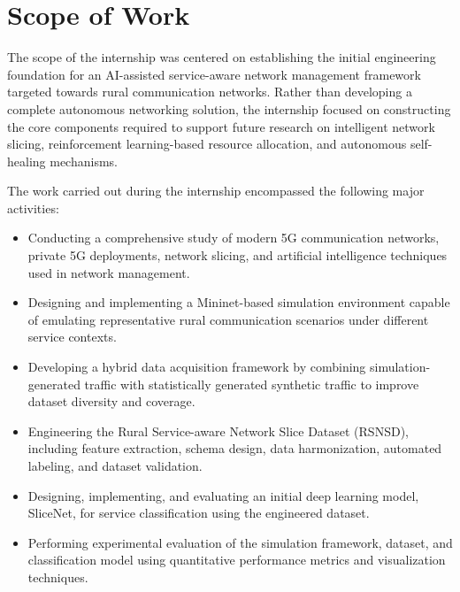 \documentclass[12pt,a4paper]{report}
\begin{document}
	
	\section{Scope of Work}
	\label{sec:scope}
	
	The scope of the internship was centered on establishing the initial engineering foundation for an AI-assisted service-aware network management framework targeted towards rural communication networks. Rather than developing a complete autonomous networking solution, the internship focused on constructing the core components required to support future research on intelligent network slicing, reinforcement learning-based resource allocation, and autonomous self-healing mechanisms.
	
	The work carried out during the internship encompassed the following major activities:
	
	\begin{itemize}
		
		\item Conducting a comprehensive study of modern 5G communication networks, private 5G deployments, network slicing, and artificial intelligence techniques used in network management.
		
		\item Designing and implementing a Mininet-based simulation environment capable of emulating representative rural communication scenarios under different service contexts.
		
		\item Developing a hybrid data acquisition framework by combining simulation-generated traffic with statistically generated synthetic traffic to improve dataset diversity and coverage.
		
		\item Engineering the Rural Service-aware Network Slice Dataset (RSNSD), including feature extraction, schema design, data harmonization, automated labeling, and dataset validation.
		
		\item Designing, implementing, and evaluating an initial deep learning model, SliceNet, for service classification using the engineered dataset.
		
		\item Performing experimental evaluation of the simulation framework, dataset, and classification model using quantitative performance metrics and visualization techniques.
		
	\end{itemize}
	
\end{document}
